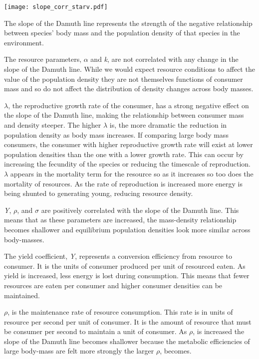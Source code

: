 \documentclass[]{rsos}%
\begin{document}
\vspace{0.5cm}
	
\texttt{[image: slope\_corr\_starv.pdf]}

\vspace{0.5cm}

The slope of the Damuth line represents the strength of the negative relationship between species’ body mass and the population density of that species in the environment. 


The resource parameters, $\alpha$ and \emph{k}, are not correlated with any change in the slope of the Damuth line. While we would expect resource conditions to affect the value of the population density they are not themselves functions of consumer mass and so do not affect the distribution of density changes across body masses.


$\lambda$, the reproductive growth rate of the consumer, has a strong negative effect on the slope of the Damuth line, making the relationship between consumer mass and density steeper. The higher $\lambda$ is, the more dramatic the reduction in population density as body mass increases. If comparing large body mass consumers, the consumer with higher reproductive growth rate will exist at lower population densities than the one with a lower growth rate. This can occur by increasing the fecundity of the species or reducing the timescale of reproduction. 
 $\lambda$ appears in the mortality term for the resource so as it increases so too does the mortality of resources. As the rate of reproduction is increased more energy is being shunted to generating young, reducing resource density.



\emph{Y}, $\rho$, and $\sigma$ are positively correlated with the slope of the Damuth line. This means that as these parameters are increased, the mass-density relationship becomes shallower and equilibrium population densities look more similar across body-masses. 

The yield coefficient, \emph{Y}, represents a conversion efficiency from resource to consumer. It is the units of consumer produced per unit of resourced eaten. As yield is increased, less energy is lost during consumption. This means that fewer resources are eaten per consumer and higher consumer densities can be maintained. 

$\rho$, is the maintenance rate of resource consumption. This rate is in units of resource per second per unit of consumer. It is the amount of resource that must be consumer per second to maintain a unit of consumer. As $\rho$, is increased the slope of the Damuth line becomes shallower because the metabolic efficiencies of large body-mass are felt more strongly the larger $\rho$, becomes. 
\end{document}
